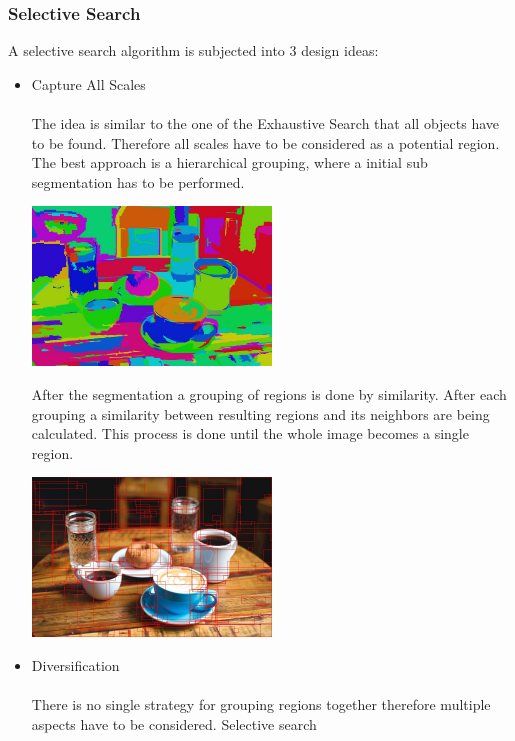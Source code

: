 \subsubsection{Selective Search}
A selective search algorithm is subjected into 3 design ideas:
\begin{itemize}
    \item Capture All Scales \\ \\
        The idea is similar to the one of the Exhaustive Search that all objects have to be found. Therefore all scales have to be
        considered as a potential region. The best approach is a hierarchical grouping, where a initial sub segmentation has to
        be performed. \cite{selectivesearch}
        \begin{center}
            \includegraphics[width=0.5\textwidth]{images/breakfast_fnh.jpg}\cite{sssegmentationc}
        \end{center}
        After the segmentation a grouping of regions is done by similarity. After each grouping a similarity between
        resulting regions and its neighbors are being calculated. This process is done until the whole image becomes a single region.
        \cite{selectivesearch}
        \begin{center}
            \includegraphics[width=0.5\textwidth]{images/breakfast-top-200-proposals.jpg}\cite{sssegmentationbb}
        \end{center}
    \item Diversification \\ \\
        There is no single strategy for grouping regions together therefore multiple aspects have to be considered. Selective search

\end{itemize}
